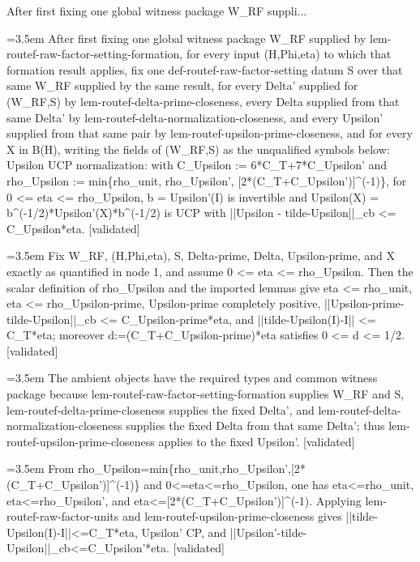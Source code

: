 \documentclass{article}
\newcommand{\step}[1]{\par\noindent\hangindent=3.5em\hangafter=1%
  \makebox[3.5em][l]{\textbf{#1.}}}
\newcommand{\steptag}[1]{\hfill{\small\textsf{[#1]}}}
\begin{document}
\begin{proofbox}{After first fixing one global witness package W\_RF suppli...}
\step{1} After first fixing one global witness package W\_RF supplied by lem-routef-raw-factor-setting-formation, for every input (H,Phi,eta) to which that formation result applies, fix one def-routef-raw-factor-setting datum S over that same W\_RF supplied by the same result, for every Delta' supplied for (W\_RF,S) by lem-routef-delta-prime-closeness, every Delta supplied from that same Delta' by lem-routef-delta-normalization-closeness, and every Upsilon' supplied from that same pair by lem-routef-upsilon-prime-closeness, and for every X in B(H), writing the fields of (W\_RF,S) as the unqualified symbols below: Upsilon UCP normalization: with C\_Upsilon := 6*C\_T+7*C\_Upsilon' and rho\_Upsilon := min\{rho\_unit, rho\_Upsilon', [2*(C\_T+C\_Upsilon')]\textasciicircum{}(-1)\}, for 0 <= eta <= rho\_Upsilon, b = Upsilon'(I) is invertible and Upsilon(X) = b\textasciicircum{}(-1/2)*Upsilon'(X)*b\textasciicircum{}(-1/2) is UCP with ||Upsilon - tilde-Upsilon||\_cb <= C\_Upsilon*eta. \steptag{validated} \\[6pt]
\step{1.1} Fix W\_RF, (H,Phi,eta), S, Delta-prime, Delta, Upsilon-prime, and X exactly as quantified in node 1, and assume 0 <= eta <= rho\_Upsilon. Then the scalar definition of rho\_Upsilon and the imported lemmas give eta <= rho\_unit, eta <= rho\_Upsilon-prime, Upsilon-prime completely positive, ||Upsilon-prime-tilde-Upsilon||\_cb <= C\_Upsilon-prime*eta, and ||tilde-Upsilon(I)-I|| <= C\_T*eta; moreover d:=(C\_T+C\_Upsilon-prime)*eta satisfies 0 <= d <= 1/2. \steptag{validated} \\[6pt]
\step{1.1.1} The ambient objects have the required types and common witness package because lem-routef-raw-factor-setting-formation supplies W\_RF and S, lem-routef-delta-prime-closeness supplies the fixed Delta', and lem-routef-delta-normalization-closeness supplies the fixed Delta from that same Delta'; thus lem-routef-upsilon-prime-closeness applies to the fixed Upsilon'. \steptag{validated} \\[4pt]
\step{1.1.2} From rho\_Upsilon=min\{rho\_unit,rho\_Upsilon',[2*(C\_T+C\_Upsilon')]\textasciicircum{}(-1)\} and 0<=eta<=rho\_Upsilon, one has eta<=rho\_unit, eta<=rho\_Upsilon', and eta<=[2*(C\_T+C\_Upsilon')]\textasciicircum{}(-1). Applying lem-routef-raw-factor-units and lem-routef-upsilon-prime-closeness gives ||tilde-Upsilon(I)-I||<=C\_T*eta, Upsilon' CP, and ||Upsilon'-tilde-Upsilon||\_cb<=C\_Upsilon'*eta. \steptag{validated} \\[4pt]

\end{proofbox}
\end{document}
